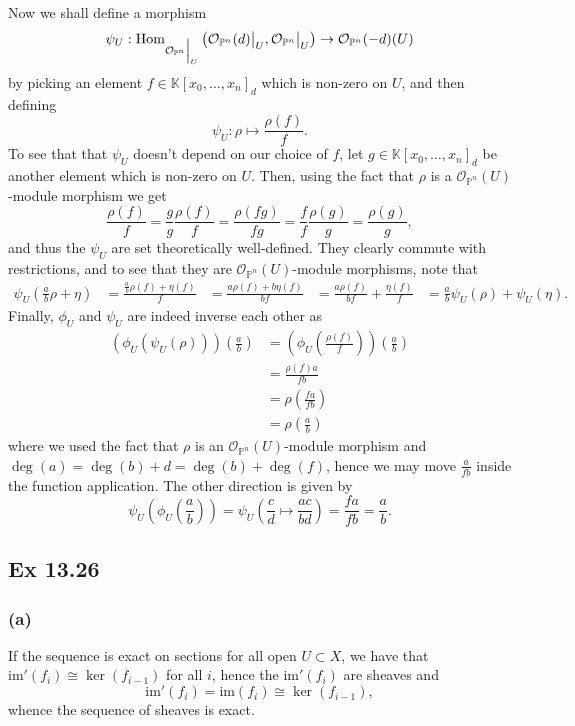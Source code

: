 \documentclass{article}
\newcommand\restr[2]{{%
  \left.\kern-\nulldelimiterspace %
  #1 %
  \vphantom{\big|} %
  \right|_{#2} %
  }}
\theoremstyle{definition}
\newcommand{\K}{\mathbb{K}}
\renewcommand{\P}{\mathbb{P}}
\newcommand{\Pn}{\P^n}
\newcommand{\Hom}{\text{Hom}}
\newcommand{\im}{\text{im}}
\newcommand{\oo}{\mathcal{O}}
\begin{document}
Now we shall define a morphism
\[
	\psi_U 
	: 
	\Hom_{\restr{\oo_{\Pn}}{U}}\left(\restr{\oo_{\Pn}(d)}{U}, \restr{\oo_{\Pn}}{U}\right)
	\to
	\oo_{\Pn}(-d)(U) 
\]
by picking an element $f \in \K[x_0, \ldots, x_n]_d$ which is non-zero on $U$, and then defining
\[
	\psi_U : \rho \mapsto 
	\frac{\rho(f)}{f}.
\]
To see that that $\psi_U$ doesn't depend on our choice of $f$, let $g \in
\K[x_0, \ldots, x_n]_{d}$ be another element which is non-zero on $U$. Then,
using the fact that $\rho$ is a $\oo_{\Pn}(U)$-module morphism we get
\[
	\frac{\rho(f)}{f}
	=
	\frac{g}{g}
	\frac{\rho(f)}{f}
	=
	\frac{\rho(fg)}{fg}
	=
	\frac{f}{f}
	\frac{\rho(g)}{g}
	=
	\frac{\rho(g)}{g},
\] 
and thus the $\psi_U$ are set theoretically well-defined. They clearly commute
with restrictions, and to see that they are $\oo_{\Pn}(U)$-module morphisms,
note that 
\begin{align*}
	\psi_{U}\left(\frac{a}{b}\rho + \eta\right)
	&=
	\frac{\frac{a}{b}\rho(f) + \eta(f)}{f}
	&=
	\frac{a\rho(f) + b\eta(f)}{bf}
	&=
	\frac{a\rho(f)}{bf} + \frac{\eta(f)}{f}
	&=
	\frac{a}{b}\psi_{U}\left(\rho\right) + \psi_U\left(\eta\right).
\end{align*} 
Finally, $\phi_U$ and $\psi_U$ are indeed inverse each other as 
\begin{align*}
	\left(\phi_U\left(\psi_U(\rho)\right)\right)\left(\frac{a}{b}\right)
	&=
	\left(\phi_U\left(\frac{\rho(f)}{f}\right)\right)\left(\frac{a}{b}\right) \\
	&=
	\frac{\rho(f)a}{fb} \\
	&=
	\rho\left(\frac{fa}{fb}\right) \\
	&=
	\rho\left(\frac{a}{b}\right)
\end{align*} 
where we used the fact that $\rho$ is an $\oo_{\Pn}(U)$-module morphism and
$\deg(a) = \deg(b) + d = \deg(b) + \deg(f)$, hence we may move $\frac{a}{fb}$
inside the function application. The other direction is given by 
\[
	\psi_U\left(\phi_U\left(\frac{a}{b}\right)\right)
	=
	\psi_U\left(\frac{c}{d} \mapsto \frac{ac}{bd}\right)
	=
	\frac{fa}{fb}
	=
	\frac{a}{b}.
\] 



\subsection*{Ex 13.26}
\subsubsection*{(a)}

If the sequence is exact on sections for all open $U \subset X$, we have that
$\im'(f_i) \cong \ker(f_{i - 1})$ for all $i$, hence the $\im'(f_i)$ are
sheaves and
\[
	\im'(f_i) = \im(f_i) \cong \ker(f_{i - 1}),
\]
whence the sequence of sheaves is exact.
\end{document}
